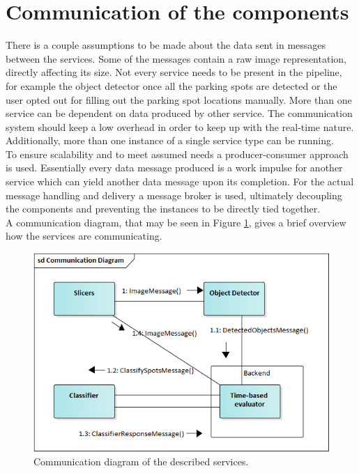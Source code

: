 \documentclass[thesis=M,english]{FITthesis}[2019/03/06]
\begin{document}
\section{Communication of the components}
There is a couple assumptions to be made about the data sent in messages between the services. Some of the messages contain a raw image representation, directly affecting its size. Not every service needs to be present in the pipeline, for example the object detector once all the parking spots are detected or the user opted out for filling out the parking spot locations manually. More than one service can be dependent on data produced by other service. The communication system should keep a low overhead in order to keep up with the real-time nature. Additionally, more than one instance of a single service type can be running. \\

To ensure scalability and to meet assumed needs a producer-consumer approach is used. Essentially every data message produced is a work impulse for another service which can yield another data message upon its completion. For the actual message handling and delivery a message broker is used, ultimately decoupling the components and preventing the instances to be directly tied together.\\

A communication diagram, that may be seen in Figure \ref{label:communication_diagram}, gives a brief overview how the services are communicating.


\begin{figure}[ht!]
	\centering
	\includegraphics[width=\textwidth]{imgs/comm-diagram.png}
	\caption{Communication diagram of the described services.}
	\label{label:communication_diagram}
\end{figure}
\end{document}
